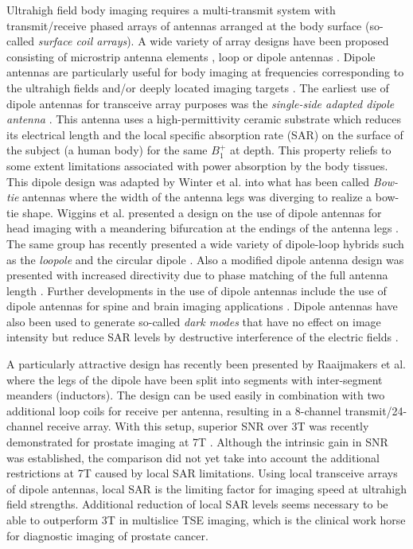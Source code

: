 \documentclass[fleqn,10pt]{wlscirep}
\begin{document}
Ultrahigh field body imaging requires a multi-transmit system with transmit/receive phased arrays of antennas arranged at the body surface (so-called \textit{surface coil arrays}). A wide variety of array designs have been proposed consisting of microstrip antenna elements \cite{Shim_prost, orzada2009flexible, Cardiac7T}, loop \cite{Cardiac16ch_7T} or dipole antennas \cite{Raaijmakers_dipole, Winter_Hyperthermia, wiggins2013mixing, Fractionated}.  
Dipole antennas are particularly useful for body imaging at frequencies corresponding to the ultrahigh fields and/or deeply located imaging targets \cite{Ideal_current_pattern, Dip_loop_comp}. The earliest use of dipole antennas for transceive array purposes was the \textit{single-side adapted dipole antenna} \cite{Raaijmakers_dipole}. This antenna uses a high-permittivity ceramic substrate which reduces its electrical length and the local specific absorption rate (SAR) on the surface of the subject (a human body) for the same $B_1^{+}$  at depth. This property reliefs to some extent limitations associated with power absorption by the body tissues.  This dipole design was adapted by Winter et al. into what has been called  \textit{Bow-tie} antennas \cite{Winter_Hyperthermia} where the width of the antenna legs was diverging to realize a bow-tie shape. Wiggins et al. presented a design on the use of dipole antennas for head imaging with a meandering bifurcation at the endings of the antenna legs \cite{wiggins2012electric}. The same group has recently presented a wide variety of dipole-loop hybrids such as the \textit{loopole} \cite{lakshmanan2014loopole} and the circular dipole \cite{lakshmanan2014circular}. Also a modified dipole antenna design was presented with increased directivity due to phase matching of the full antenna length \cite{Curved_dipole}. Further developments in the use of dipole antennas include the use of dipole antennas for spine \cite{Spine_dip} and brain imaging applications \cite{chen20147t}. Dipole antennas have also been used to generate so-called \textit{dark modes} that have no effect on image intensity but reduce SAR levels by destructive interference of the electric fields \cite{Dark_modes}.

A particularly attractive design has recently been presented by Raaijmakers et al. \cite{Fractionated} where the legs of the dipole have been split into segments with inter-segment meanders (inductors). The design can be used easily in combination with two additional loop coils for receive per antenna, resulting in a 8-channel transmit/24-channel receive array. With this setup, superior SNR over 3T was recently demonstrated for prostate imaging at 7T \cite{Ingmar_comb}. Although the intrinsic gain in SNR was established, the comparison did not yet take into account the additional restrictions at 7T caused by local SAR limitations. Using local transceive arrays of dipole antennas, local SAR is the limiting factor for imaging speed at ultrahigh field strengths. Additional reduction of local SAR levels seems necessary to be able to outperform 3T in multislice TSE imaging, which is the clinical work horse for diagnostic imaging of prostate cancer.
\end{document}
